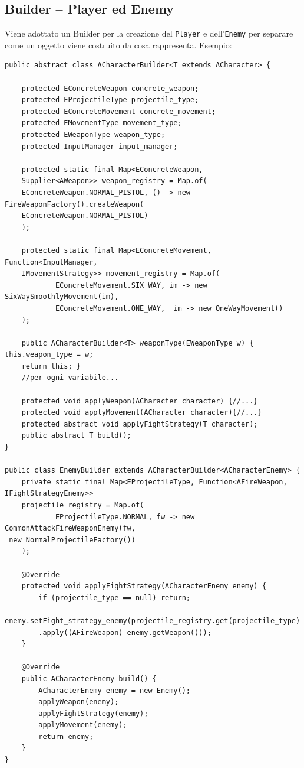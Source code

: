 \documentclass[12pt,a4paper]{article}
\begin{document}
\begin{small}
\subsection{Builder – Player ed Enemy}
Viene adottato un Builder per la creazione del \texttt{Player} e dell'\texttt{Enemy} per separare come un oggetto viene costruito da cosa rappresenta. Esempio:
\begin{verbatim}
public abstract class ACharacterBuilder<T extends ACharacter> {

    protected EConcreteWeapon concrete_weapon;
    protected EProjectileType projectile_type;
    protected EConcreteMovement concrete_movement;
    protected EMovementType movement_type;
    protected EWeaponType weapon_type;
    protected InputManager input_manager;

    protected static final Map<EConcreteWeapon, 
    Supplier<AWeapon>> weapon_registry = Map.of(
    EConcreteWeapon.NORMAL_PISTOL, () -> new FireWeaponFactory().createWeapon(
    EConcreteWeapon.NORMAL_PISTOL)
    );

    protected static final Map<EConcreteMovement, Function<InputManager, 
    IMovementStrategy>> movement_registry = Map.of(
            EConcreteMovement.SIX_WAY, im -> new SixWaySmoothlyMovement(im),
            EConcreteMovement.ONE_WAY,  im -> new OneWayMovement()
    );

    public ACharacterBuilder<T> weaponType(EWeaponType w) { this.weapon_type = w; 
    return this; }
    //per ogni variabile...

    protected void applyWeapon(ACharacter character) {//...}
    protected void applyMovement(ACharacter character){//...}
    protected abstract void applyFightStrategy(T character);
    public abstract T build();
}

public class EnemyBuilder extends ACharacterBuilder<ACharacterEnemy> {
    private static final Map<EProjectileType, Function<AFireWeapon, IFightStrategyEnemy>> 
    projectile_registry = Map.of(
            EProjectileType.NORMAL, fw -> new CommonAttackFireWeaponEnemy(fw,
 new NormalProjectileFactory())
    );

    @Override
    protected void applyFightStrategy(ACharacterEnemy enemy) {
        if (projectile_type == null) return;
        enemy.setFight_strategy_enemy(projectile_registry.get(projectile_type)
        .apply((AFireWeapon) enemy.getWeapon()));
    }

    @Override
    public ACharacterEnemy build() {
        ACharacterEnemy enemy = new Enemy();
        applyWeapon(enemy);
        applyFightStrategy(enemy);
        applyMovement(enemy);
        return enemy;
    }
}
\end{verbatim}



\end{small}
\end{document}
